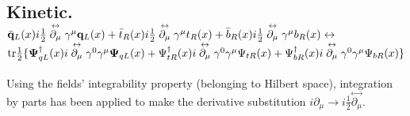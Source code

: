 \documentclass[12pt]{article}
\renewcommand\[{\begin{dmath}}
\renewcommand\]{\end{dmath}}
\newcommand{\boldmathPsi}{\mbox{\boldmath$\Psi$\unboldmath}}
\begin{document}
 \subsection {Kinetic. ${\bar {\bf q }_L}(x)  i\frac{1}{2}\stackrel{\leftrightarrow}{\partial_\mu}    \gamma^\mu  { \bf q}_L (x)     +  { \bar   t_R    }(x)        i\frac{1}{2}\stackrel{\leftrightarrow}{\partial_\mu}      \gamma^\mu    t_{R}(x)
 +{ \bar   b_R  (x)    }       i\frac{1}{2}\stackrel{\leftrightarrow}{\partial_\mu }        \gamma^\mu    b_{R}(x)
\leftrightarrow$ $ {\rm tr }\frac{1}{2} \{ { \boldmathPsi_{qL}   ^\dagger     }(x)         i\stackrel{\leftrightarrow}{\partial_\mu }    \gamma^0  \gamma^\mu   \boldmathPsi_{qL} (x) +
         \Psi _{tR } ^\dagger (x)         i\stackrel{\leftrightarrow}{\partial_\mu}       \gamma^0 \gamma^\mu     {     \Psi _{tR }}(x)
 +{     \Psi}_{bR}  ^\dagger(x)               i\stackrel{\leftrightarrow}{\partial_\mu  }     \gamma^0 \gamma^\mu    { \Psi_{bR} }(x)  \} $ }
 Using the fields' integrability property (belonging to Hilbert space),   integration by parts has been applied to make the  derivative  substitution  $ i{\partial_\mu}\rightarrow i\frac{1}{2}\stackrel{\leftrightarrow}{\partial_\mu}$.
\end{document}
